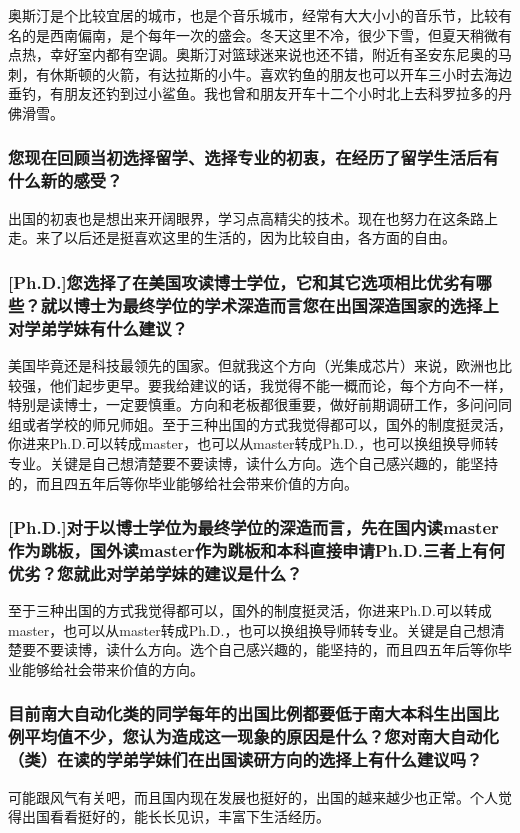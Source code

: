 \documentclass[a4paper,UTF8]{book}
\begin{document}
    奥斯汀是个比较宜居的城市，也是个音乐城市，经常有大大小小的音乐节，比较有名的是西南偏南，是个每年一次的盛会。冬天这里不冷，很少下雪，但夏天稍微有点热，幸好室内都有空调。奥斯汀对篮球迷来说也还不错，附近有圣安东尼奥的马刺，有休斯顿的火箭，有达拉斯的小牛。喜欢钓鱼的朋友也可以开车三小时去海边垂钓，有朋友还钓到过小鲨鱼。我也曾和朋友开车十二个小时北上去科罗拉多的丹佛滑雪。    
    
    \subsubsection*{您现在回顾当初选择留学、选择专业的初衷，在经历了留学生活后有什么新的感受？}
    出国的初衷也是想出来开阔眼界，学习点高精尖的技术。现在也努力在这条路上走。来了以后还是挺喜欢这里的生活的，因为比较自由，各方面的自由。
    
    \subsubsection*{[Ph.D.]您选择了在美国攻读博士学位，它和其它选项相比优劣有哪些？就以博士为最终学位的学术深造而言您在出国深造国家的选择上对学弟学妹有什么建议？}
    美国毕竟还是科技最领先的国家。但就我这个方向（光集成芯片）来说，欧洲也比较强，他们起步更早。要我给建议的话，我觉得不能一概而论，每个方向不一样，特别是读博士，一定要慎重。方向和老板都很重要，做好前期调研工作，多问问同组或者学校的师兄师姐。至于三种出国的方式我觉得都可以，国外的制度挺灵活，你进来Ph.D.可以转成master，也可以从master转成Ph.D.，也可以换组换导师转专业。关键是自己想清楚要不要读博，读什么方向。选个自己感兴趣的，能坚持的，而且四五年后等你毕业能够给社会带来价值的方向。

    \subsubsection*{[Ph.D.]对于以博士学位为最终学位的深造而言，先在国内读master作为跳板，国外读master作为跳板和本科直接申请Ph.D.三者上有何优劣？您就此对学弟学妹的建议是什么？}
    至于三种出国的方式我觉得都可以，国外的制度挺灵活，你进来Ph.D.可以转成master，也可以从master转成Ph.D.，也可以换组换导师转专业。关键是自己想清楚要不要读博，读什么方向。选个自己感兴趣的，能坚持的，而且四五年后等你毕业能够给社会带来价值的方向。

    \subsubsection*{目前南大自动化类的同学每年的出国比例都要低于南大本科生出国比例平均值不少，您认为造成这一现象的原因是什么？您对南大自动化（类）在读的学弟学妹们在出国读研方向的选择上有什么建议吗？}
    可能跟风气有关吧，而且国内现在发展也挺好的，出国的越来越少也正常。个人觉得出国看看挺好的，能长长见识，丰富下生活经历。
    
\end{document}
